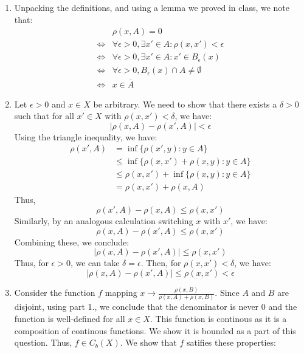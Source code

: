 \documentclass[12pt]{article}
\begin{document}
\begin{solu}
    \bbni
    \begin{enumerate}
        \item Unpacking the definitions, and using a lemma we proved in class, we note that:
        \begin{align*}
            &\rho(x, A) = 0  \\
            \iff &\forall \epsilon > 0, \exists x' \in A: \rho(x,x') < \epsilon \\
            \iff &\forall \epsilon > 0, \exists x' \in A: x' \in B_\epsilon(x) \\
            \iff &\forall \epsilon > 0, B_\epsilon(x) \cap A \neq \emptyset \\
            \iff &x \in \overline{A}
        \end{align*}
        \item Let $\epsilon > 0$ and $x \in X$ be arbitrary. We need to show that there exists a $\delta > 0$ such that for all $x' \in X$ with $\rho(x, x') < \delta$, we have:
        \[|\rho(x, A) - \rho(x', A)| < \epsilon\]
        Using the triangle inequality, we have:
        \begin{align*}
            \rho(x', A) &= \inf\{ \rho(x', y) : y\in A \} \\
            &\leq \inf\{ \rho(x, x') + \rho(x, y) : y \in A \} \\
            &\leq \rho(x, x') + \inf\{ \rho(x, y) : y \in A \} \\
            &= \rho(x, x') + \rho(x, A)
        \end{align*}
        Thus, 
        \[ \rho(x', A) - \rho(x, A) \leq \rho(x, x') \]
        Similarly, by an analogous calculation switching $x$ with $x'$, we have:
        \[ \rho(x, A) - \rho(x', A) \leq \rho(x, x') \]
        Combining these, we conclude: 
        \[ |\rho(x, A) - \rho(x', A)| \leq \rho(x, x')\]
        Thus, for $\epsilon > 0$, we can take $\delta = \epsilon$. Then, for $\rho(x, x') < \delta$, we have:
        \[ |\rho(x, A) - \rho(x', A)| \leq \rho(x, x') < \epsilon \]
        \item Consider the function $f$ mapping $x \to \frac{\rho(x, B)}{\rho(x, A) + \rho(x, B)}$. Since $A$ and $B$ are disjoint, using part 1., we conclude that the denominator is never $0$ and the function is well-defined for all $x \in X$. This function is continous as it is a composition of continous functions.  We show it is bounded as a part of this question. Thus, $f \in C_b(X)$. We show that $f$ satifies these properties:  

\end{enumerate}
\end{solu}
\end{document}
